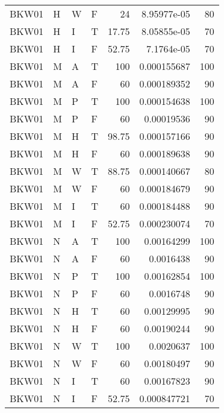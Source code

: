 \begin{table}[!htb]
{\begin{tabular}{llllrrr}
            BKW01    & H     & W     & F          & 24         & 8.95977e-05 & 80       \\
            BKW01    & H     & I     & T          & 17.75      & 8.05855e-05 & 70       \\
            BKW01    & H     & I     & F          & 52.75      & 7.1764e-05  & 70       \\
            BKW01    & M     & A     & T          & 100        & 0.000155687 & 100      \\
            BKW01    & M     & A     & F          & 60         & 0.000189352 & 90       \\
            BKW01    & M     & P     & T          & 100        & 0.000154638 & 100      \\
            BKW01    & M     & P     & F          & 60         & 0.00019536  & 90       \\
            BKW01    & M     & H     & T          & 98.75      & 0.000157166 & 90       \\
            BKW01    & M     & H     & F          & 60         & 0.000189638 & 90       \\
            BKW01    & M     & W     & T          & 88.75      & 0.000140667 & 80       \\
            BKW01    & M     & W     & F          & 60         & 0.000184679 & 90       \\
            BKW01    & M     & I     & T          & 60         & 0.000184488 & 90       \\
            BKW01    & M     & I     & F          & 52.75      & 0.000230074 & 70       \\
            BKW01    & N     & A     & T          & 100        & 0.00164299  & 100      \\
            BKW01    & N     & A     & F          & 60         & 0.0016438   & 90       \\
            BKW01    & N     & P     & T          & 100        & 0.00162854  & 100      \\
            BKW01    & N     & P     & F          & 60         & 0.0016748   & 90       \\
            BKW01    & N     & H     & T          & 60         & 0.00129995  & 90       \\
            BKW01    & N     & H     & F          & 60         & 0.00190244  & 90       \\
            BKW01    & N     & W     & T          & 100        & 0.0020637   & 100      \\
            BKW01    & N     & W     & F          & 60         & 0.00180497  & 90       \\
            BKW01    & N     & I     & T          & 60         & 0.00167823  & 90       \\
            BKW01    & N     & I     & F          & 52.75      & 0.000847721 & 70       \\
            \hline
        \end{tabular}
    }{}
\end{table}